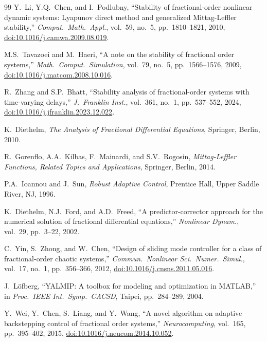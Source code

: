 \documentclass[12pt,a4paper]{article}
\begin{document}
\begin{thebibliography}{99}
Y.\ Li, Y.Q.\ Chen, and I.\ Podlubny, ``Stability of fractional-order nonlinear dynamic systems: Lyapunov direct method and generalized Mittag-Leffler stability,'' \textit{Comput.\ Math.\ Appl.}, vol.\ 59, no.\ 5, pp.\ 1810--1821, 2010, \href{https://doi.org/10.1016/j.camwa.2009.08.019}{doi:10.1016/j.camwa.2009.08.019}.

M.S.\ Tavazoei and M.\ Haeri, ``A note on the stability of fractional order systems,'' \textit{Math.\ Comput.\ Simulation}, vol.\ 79, no.\ 5, pp.\ 1566--1576, 2009, \href{https://doi.org/10.1016/j.matcom.2008.10.016}{doi:10.1016/j.matcom.2008.10.016}.

R.\ Zhang and S.P.\ Bhatt, ``Stability analysis of fractional-order systems with time-varying delays,'' \textit{J.\ Franklin Inst.}, vol.\ 361, no.\ 1, pp.\ 537--552, 2024, \href{https://doi.org/10.1016/j.jfranklin.2023.12.022}{doi:10.1016/j.jfranklin.2023.12.022}.

K.\ Diethelm, \textit{The Analysis of Fractional Differential Equations}, Springer, Berlin, 2010.

R.\ Gorenflo, A.A.\ Kilbas, F.\ Mainardi, and S.V.\ Rogosin, \textit{Mittag-Leffler Functions, Related Topics and Applications}, Springer, Berlin, 2014.

P.A.\ Ioannou and J.\ Sun, \textit{Robust Adaptive Control}, Prentice Hall, Upper Saddle River, NJ, 1996.

K.\ Diethelm, N.J.\ Ford, and A.D.\ Freed, ``A predictor-corrector approach for the numerical solution of fractional differential equations,'' \textit{Nonlinear Dynam.}, vol.\ 29, pp.\ 3--22, 2002.

C.\ Yin, S.\ Zhong, and W.\ Chen, ``Design of sliding mode controller for a class of fractional-order chaotic systems,'' \textit{Commun.\ Nonlinear Sci.\ Numer.\ Simul.}, vol.\ 17, no.\ 1, pp.\ 356--366, 2012, \href{https://doi.org/10.1016/j.cnsns.2011.05.016}{doi:10.1016/j.cnsns.2011.05.016}.

J.\ Löfberg, ``YALMIP: A toolbox for modeling and optimization in MATLAB,'' in \textit{Proc.\ IEEE Int.\ Symp.\ CACSD}, Taipei, pp.\ 284--289, 2004.

Y.\ Wei, Y.\ Chen, S.\ Liang, and Y.\ Wang, ``A novel algorithm on adaptive backstepping control of fractional order systems,'' \textit{Neurocomputing}, vol.\ 165, pp.\ 395--402, 2015, \href{https://doi.org/10.1016/j.neucom.2014.10.052}{doi:10.1016/j.neucom.2014.10.052}.

\end{thebibliography}
\end{document}
